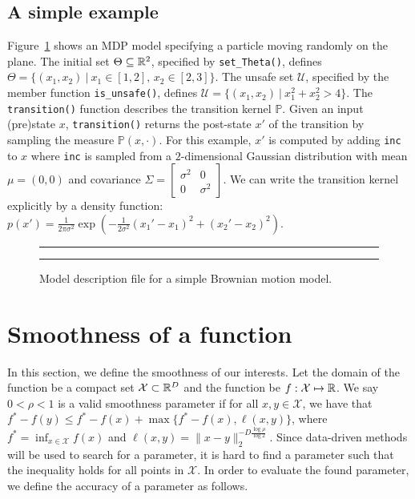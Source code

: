 \documentclass[12pt]{article}
\newcommand{\num}[1]{\relax\ifmmode \mathbb #1\else $\mathbb #1$\fi}
\newcommand{\reals}{{\num R}}                    %
\newcommand{\X}{\mathcal{X}}
\newcommand{\Unsafe}{\mathcal{U}}
\newcommand{\two}[4]{
  \parbox{.95\columnwidth}{\vspace{1pt} \vfill
    \parbox[t]{#1\columnwidth}{#3}%
    \parbox[t]{#2\columnwidth}{#4}%
  }}
\begin{document}
\subsection{A simple example}
\label{ex:simple}
Figure~\ref{fig:brownian} shows an MDP model specifying a particle moving randomly on the  plane.
The initial set $\Theta \subseteq \reals^2$, specified by \texttt{set\_Theta()},  defines $\Theta = \{(x_1, x_2)~|~x_1 \in [1,2],\,x_2 \in [2,3]\}$.
The unsafe set $\Unsafe$,  specified by the member function \texttt{is\_unsafe()}, defines $\Unsafe = \{(x_1, x_2)~|~x_1^2+x_2^2 > 4\}$. The \texttt{transition()} function describes the transition kernel $\mathbb{P}$. Given an input (pre)state $x$, \texttt{transition()} returns the post-state $x'$ of the transition by sampling  the measure $\mathbb{P}(x, \cdot)$. For this example, $x'$ is computed by adding \texttt{inc} to $x$ where \texttt{inc} is sampled from a $2$-dimensional Gaussian distribution with mean $\mu = (0, 0)$ and covariance $\Sigma = \begin{bmatrix} \sigma^2 & 0\\ 0 & \sigma^2 \end{bmatrix}$. We can write the  transition kernel explicitly by a density function: $ p(x')= \frac{1}{2\pi \sigma^2} \exp(-\frac{1}{2 \sigma^2}(x_1'-x_1)^2+(x_2'-x_2)^2)$.

\begin{figure}
	\centering
	\hrule
	\two{.46}{.54}
	{}
	{}
	\hrule
	\caption{\small Model description file for a simple Brownian motion model.}
	\label{fig:brownian}
\end{figure}

\section{Smoothness of a function}
In this section, we define the smoothness of our interests. Let the domain of the function be a compact set $\X \subset \reals^D$ and the function be $f : \X \mapsto \reals$. We say $0 < \rho < 1$ is a valid smoothness parameter if for all $x, y \in \X$, we have that $f^* - f(y) \leq f^* - f(x) + \max\{f^* - f(x), \ell(x,y)\}$, where $f^* = \inf_{x \in \X} f(x)$ and $\ell(x,y) = \|x-y\|_2^{-D\frac{\log \rho}{\log 2}}$. Since data-driven methods will be used to search for a parameter, it is hard to find a parameter such that the inequality holds for all points in $\X$. In order to evaluate the found parameter, we define the accuracy of a parameter as follows.
\newcommand{\Unif}[1]{\texttt{Unif}\left(#1\right)}
\newcommand{\Acc}[1]{\texttt{Acc}\left(#1\right)}
\newcommand{\indicator}[1]{\mathbb{I}\left(#1\right)}
\end{document}
